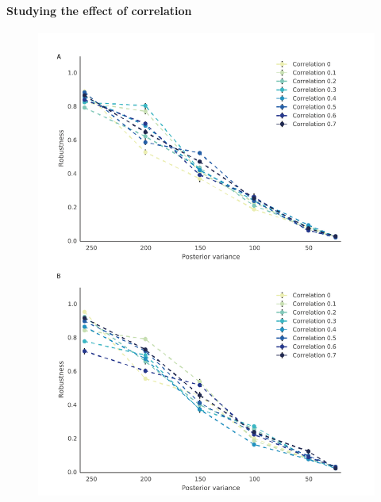 \paragraph{Studying the effect of correlation}
\begin{figure}[htbp]
\centering
\includegraphics[scale=0.6]{chapterStabilityFinder/images/normal_correl.png}
\caption[LoF caption]{}
\label{}
\end{figure}
\clearpage
